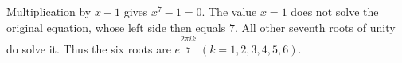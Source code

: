 Multiplication by $x-1$ gives $x^7-1=0$. The value $x=1$ does not solve the original equation, whose left side then equals $7$. All other seventh roots of unity do solve it. Thus the six roots are $\boxed{e^{\dfrac{2\pi i k}{7}}\ (k=1,2,3,4,5,6)}$.
